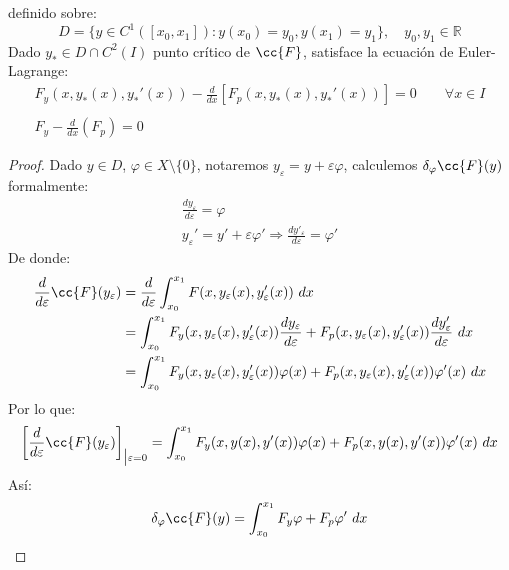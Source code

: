 \begin{teo}
    definido sobre:
    \begin{equation*}
        D = \{y\in C^1([x_0,x_1]) : y(x_0) = y_0, y(x_1) = y_1\}, \quad y_0,y_1\in \mathbb{R}
    \end{equation*}
    Dado $y_\ast\in D\cap C^2(I)$ punto crítico de $\cc{F}$, satisface la ecuación de Euler-Lagrange:
    \begin{gather*}
        F_y(x,y_\ast(x),y_\ast'(x)) - \frac{d}{dx}\left[F_p(x,y_\ast(x),y_\ast'(x))\right] = 0 \qquad \forall x\in I \\
        \\
        \boxed{F_y - \frac{d}{dx}(F_p) = 0}
    \end{gather*}
    \begin{proof}
        Dado $y\in D$, $\varphi \in X\setminus \{0\}$, notaremos $y_\varepsilon = y+\varepsilon\varphi$, calculemos $\delta_\varphi\cc{F}(y)$ formalmente:
        \begin{gather*}
            \frac{d y_\varepsilon}{d \varepsilon} = \varphi \\
            y_\varepsilon' = y' + \varepsilon\varphi' \Longrightarrow \frac{d y'_\varepsilon}{d \varepsilon} = \varphi'
        \end{gather*}
        De donde:
        \begin{align*}
            \frac{d }{d \varepsilon} \cc{F}(y_\varepsilon) &= \frac{d }{d \varepsilon}\int_{x_0}^{x_1} F(x,y_\varepsilon(x),y_\varepsilon'(x))~dx  \\ 
                                                           &= \int_{x_0}^{x_1} F_y(x,y_\varepsilon(x),y_\varepsilon'(x))\frac{d y_\varepsilon}{d \varepsilon} + F_p(x,y_\varepsilon(x),y_\varepsilon'(x))\frac{dy_\varepsilon'}{d\varepsilon}~dx  \\
                                                           &= \int_{x_0}^{x_1} F_y(x,y_\varepsilon(x),y_\varepsilon'(x))\varphi(x) + F_p(x,y_\varepsilon(x),y_\varepsilon'(x))\varphi'(x)~dx 
        \end{align*}
        Por lo que:
        \begin{equation*}
            \left[\frac{d}{d\varepsilon}\cc{F}(y_\varepsilon)\right]_{\big|\varepsilon=0} = \int_{x_0}^{x_1} F_y(x,y(x),y'(x))\varphi(x) + F_p(x,y(x),y'(x))\varphi'(x)~dx 
        \end{equation*}
        Así:
        \begin{equation*}
            \delta_\varphi \cc{F}(y) = \int_{x_0}^{x_1} F_y\varphi + F_p\varphi'~dx 
        \end{equation*}

\end{proof}
\end{teo}
